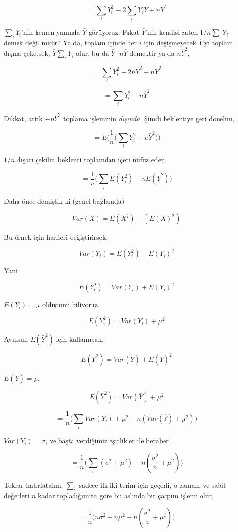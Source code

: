 \documentclass[12pt,fleqn]{article}\usepackage{../../common}
\begin{document}
$$ = \sum_iY_i^2 -2\sum_i Y_i\bar{Y} + n\bar{Y}^2  $$

$\sum_i Y_i$'nin hemen yanında $\bar{Y}$ görüyoruz. Fakat $\bar{Y}$'nin kendisi
zaten $1/n \sum_i Y_i$ demek değil midir? Ya da, toplam içinde her $i$ için
değişmeyecek $\bar{Y}$'yi toplam dışına çekersek, $\bar{Y}\sum_iY_i$ olur, bu da
$\bar{Y} \cdot n \bar{Y}$ demektir ya da $n\bar{Y}^2$,

$$ = \sum_iY_i^2 -2 n\bar{Y}^2 + n\bar{Y}^2  $$

$$ = \sum_iY_i^2 -n\bar{Y}^2  $$

Dikkat, artık $-n\bar{Y}^2$ toplama işleminin {\em dışında}. Şimdi beklentiye
geri dönelim,

$$ = E \bigg( \frac{1}{n} \bigg( \sum_iY_i^2 -n\bar{Y}^2 \bigg) \bigg) $$

$1/n$ dışarı çekilir, beklenti toplamdan içeri nüfuz eder,

$$ = \frac{1}{n} \bigg(  \sum_i  E(Y_i^2) -n E(\bar{Y}^2) \bigg) $$

Daha önce demiştik ki (genel bağlamda)

$$ Var(X) = E(X^2) - (E(X)^2)$$

Bu örnek için harfleri değiştirirsek,

$$ Var(Y_i) = E(Y_i^2) - E(Y_i)^2$$

Yani

$$ E(Y_i^2) = Var(Y_i) + E(Y_i)^2 $$

$E(Y_i) = \mu$ oldugunu biliyoruz,

$$ E(Y_i^2) = Var(Y_i) + \mu^2 $$

Aynısını $ E(\bar{Y}^2)$ için kullanırsak,

$$  E(\bar{Y}^2) = Var(\bar{Y}) + E(\bar{Y})^2 $$

$E(\bar{Y}) = \mu$, 

$$  E(\bar{Y}^2) = Var(\bar{Y}) + \mu^2 $$

$$
= \frac{1}{n} \bigg(  \sum_i Var(Y_i) + \mu^2   
-n (Var(\bar{Y}) + \mu^2 ) \bigg) 
$$

$Var(Y_i) = \sigma$, ve başta verdiğimiz eşitlikler ile beraber

$$
= \frac{1}{n} \bigg(  \sum_i (\sigma^2 + \mu^2)
-n (\frac{\sigma^2}{n} + \mu^2 ) \bigg) 
$$

Tekrar hatırlatalım, $\sum_i$ sadece ilk iki terim için geçerli, o zaman,
ve sabit değerleri $n$ kadar topladığımıza göre bu aslında bir çarpım
işlemi olur,

$$ 
= \frac{1}{n} \bigg(  n\sigma^2 + n\mu^2   
-n (\frac{\sigma^2}{n} + \mu^2 ) \bigg) 
$$
\end{document}
